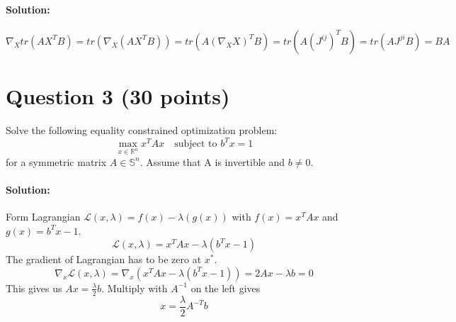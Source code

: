 \documentclass[
	10pt, %
]{../fphw}
\begin{document}
	\paragraph{Solution:} 
	\begin{equation*}
		\nabla_X tr(AX^TB) = tr(\nabla_X (AX^TB)) = tr(A(\nabla_X X)^T B) 
		= tr(A(J^{ij})^TB) = tr(AJ^{ji}B) = BA
	\end{equation*}
	
	\section*{Question 3 (30 points)}
	\begin{problem}
		Solve the following equality constrained optimization problem:
		\begin{equation*}
			\max_{x\in\mathbb{R}^n}x^TAx \quad \text{subject to } b^Tx = 1
		\end{equation*}
		for a symmetric matrix $A\in\mathbb{S}^n$. Assume that A is invertible and $b\ne 0$.
	\end{problem}
	\paragraph{Solution:} Form Lagrangian $\mathcal{L}(x,\lambda) = f(x) - \lambda (g(x))$ with $f(x) = x^TAx$ and $g(x) = b^Tx-1$.
	\begin{equation*}
		\mathcal{L}(x,\lambda) = x^TAx - \lambda(b^Tx-1)
	\end{equation*}
	The gradient of Lagrangian has to be zero at $x^*$.
	\begin{equation*}
		\nabla_x\mathcal{L}(x,\lambda) = \nabla_x(x^TAx-\lambda(b^Tx-1)) = 2Ax - \lambda b = 0
	\end{equation*}
	This gives us $Ax = \frac{\lambda}{2}b$. Multiply with $A^{-1}$ on the left gives
	\begin{equation*}
		x = \frac{\lambda}{2} A^{-T}b
	\end{equation*}
	
\end{document}
